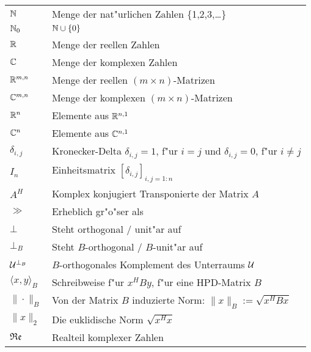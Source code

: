 \begin{tabular}{ll}
$\mathbb{N}$ & Menge der nat"urlichen Zahlen \{1,2,3,\ldots\}\\
$\mathbb{N}_{0}$ & $\mathbb{N}\cup\{0\}$\\
$\mathbb{R}$ & Menge der reellen Zahlen\\
$\mathbb{C}$ & Menge der komplexen Zahlen\\
$\mathbb{R}^{m,n}$ & Menge der reellen $(m\times n)$-Matrizen\\
$\mathbb{C}^{m,n}$ & Menge der komplexen $(m\times n)$-Matrizen\\
$\mathbb{R}^n$ & Elemente aus $\mathbb{R}^{n,1}$\\
$\mathbb{C}^n$ & Elemente aus $\mathbb{C}^{n,1}$\\
$\delta_{i,j}$ & Kronecker-Delta $\delta_{i,j} = 1$, f"ur $i=j$ und $\delta_{i,j} = 0$, f"ur $i\neq j$\\
$I_n$ & Einheitsmatrix $[\delta_{i,j}]_{i,j=1:n}$\\
$A^H$ & Komplex konjugiert Transponierte der Matrix $A$\\
$\gg$ & Erheblich gr"o"ser als\\
$\bot$ & Steht orthogonal / unit"ar auf\\
$\bot_B$ & Steht $B$-orthogonal / $B$-unit"ar auf\\
$\mathcal{U}^{\bot_B}$ & $B$-orthogonales Komplement des Unterraums $\mathcal{U}$\\
$\langle x,y\rangle_B$ & Schreibweise f"ur $x^H B y$, f"ur eine HPD-Matrix $B$\\
$\|\cdot\|_B$ & Von der Matrix $B$ induzierte Norm: $\|x\|_B := \sqrt{x^H B x}$\\
$\|x\|_2$ & Die euklidische Norm $\sqrt{x^H x}$\\
$\mathfrak{Re}$ & Realteil komplexer Zahlen
\end{tabular}
